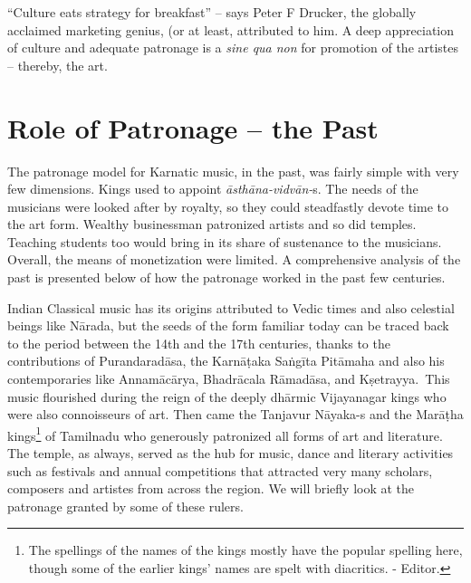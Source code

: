 \vspace{-.07cm}

“Culture eats strategy for breakfast” – says Peter F Drucker, the globally acclaimed marketing genius, (or at least, attributed to him. A deep appreciation of culture and adequate patronage is a \textit{sine qua non} for promotion of the artistes – thereby, the art.

\vspace{-.5cm}

\section*{Role of Patronage – the Past}

\vspace{-.2cm}

The patronage model for Karnatic music, in the past, was fairly simple with very few dimensions. Kings used to appoint \textit{āsthāna-vidvān-}s. The needs of the musicians were looked after by royalty, so they could steadfastly devote time to the art form. Wealthy businessman patronized artists and so did temples. Teaching students too would bring in its share of sustenance to the musicians. Overall, the means of monetization were limited. A comprehensive analysis of the past is presented below of how the patronage worked in the past few centuries.


Indian Classical music has its origins attributed to Vedic times and also celestial beings like Nārada, but the seeds of the form familiar today can be traced back to the period between the 14th and the 17th centuries, thanks to the contributions of Purandaradāsa, the Karnāṭaka Saṅgīta Pitāmaha and also his contemporaries like Annamācārya, Bhadrācala Rāmadāsa, and Kṣetrayya.~This music flourished during the reign of the deeply dhārmic Vijayanagar kings who were also connoisseurs of art. Then came the Tanjavur Nāyaka-s and the Marāṭha kings\footnote{The spellings of the names of the kings mostly have the popular spelling here, though some of the earlier kings' names are spelt with diacritics. - Editor.} of Tamilnadu who generously patronized all forms of art and literature. The temple, as always, served as the hub for music, dance and literary activities such as festivals and annual competitions that attracted very many scholars, composers and artistes from across the region. We will briefly look at the patronage granted by some of these rulers.

